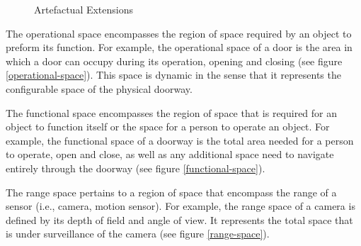 \documentclass[12pt]{ucthesis}
\begin{document}
\begin{figure}[H]
 \centering
 \hspace{7 mm}
  \hspace{7 mm}
 \caption{Artefactual Extensions}
\label{artefactual-extensions}
\end{figure}

The operational space encompasses the region of space required by an object to preform its function. For example, the operational space of a door is the area in which a door can occupy during its operation, opening and closing (see figure \ref{operational-space}). This space is dynamic in the sense that it represents the configurable space of the physical doorway. 

The functional space encompasses the region of space that is required for an object to function itself or the space for a person to operate an object. For example, the functional space of a doorway is the total area needed for a person to operate, open and close, as well as any additional space need to navigate entirely through the doorway (see figure \ref{functional-space}). 

The range space pertains to a region of space that encompass the range of a sensor (i.e., camera, motion sensor). For example, the range space of a camera is defined by its depth of field and angle of view. It represents the total space that is under surveillance of the camera (see figure \ref{range-space}).
\end{document}
